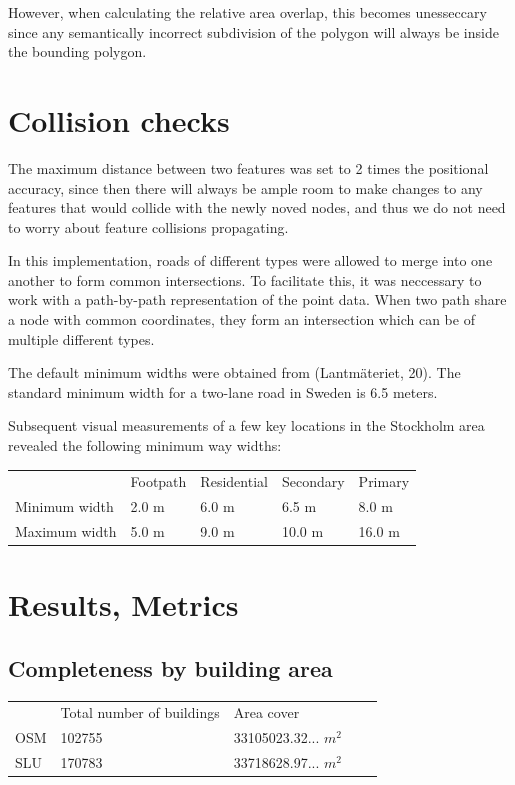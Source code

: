 \documentclass[a4paper]{article}
\begin{document}
However, when calculating the relative area overlap, this becomes unesseccary since any semantically incorrect subdivision of the polygon will always be inside the bounding polygon.

\section{Collision checks}

The maximum distance between two features was set to 2 times the positional accuracy, since then there will always be ample room to make changes to any features that would collide with the newly noved nodes, and thus we do not need to worry about feature collisions propagating.

In this implementation, roads of different types were allowed to merge into one another to form common intersections. To facilitate this, it was neccessary to work with a path-by-path representation of the point data. When two path share a node with common coordinates, they form an intersection which can be of multiple different types.

The default minimum widths were obtained from (Lantmäteriet, 20). The standard minimum width for a two-lane road in Sweden is 6.5 meters.

Subsequent visual measurements of a few key locations in the Stockholm area revealed the following minimum way widths:
\begin{table}[H]
\begin{tabular}{lllll}
                  & Footpath & Residential & Secondary & Primary \\
    Minimum width & 2.0 m    & 6.0 m       & 6.5 m     & 8.0 m   \\
    Maximum width & 5.0 m    & 9.0 m       & 10.0 m    & 16.0 m
\end{tabular}
\end{table}

\section{Results, Metrics}

\subsection{Completeness by building area}

\begin{table}[H]
\begin{tabular}{lllll}
    & Total number of buildings & Area cover \\
    OSM & 102755 & 33105023.32... $m^2$ \\
    SLU & 170783 & 33718628.97... $m^2$
\end{tabular}
\end{table}
\end{document}
